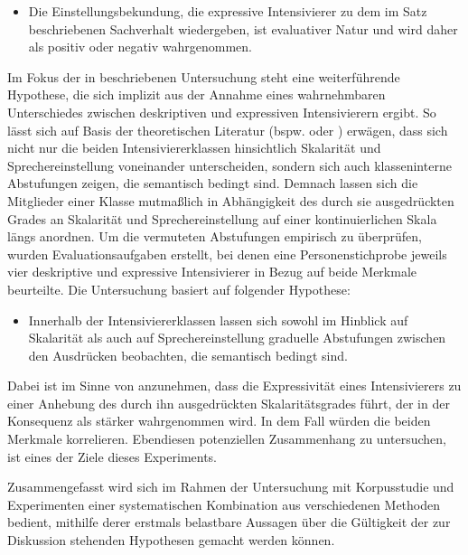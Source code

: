 \begin{itemize} 
\item[\textbf{\textsc{H5}}] Die Einstellungsbekundung, die expressive Intensivierer zu dem im Satz beschriebenen Sachverhalt wiedergeben, ist evaluativer Natur und wird daher als positiv oder negativ wahrgenommen.
\end{itemize}

Im Fokus der in  beschriebenen Untersuchung steht eine weiterführende Hypothese, die sich implizit aus der Annahme eines wahrnehmbaren Unterschiedes zwischen deskriptiven und expressiven Intensivierern ergibt. So lässt sich auf Basis der theoretischen Literatur (bspw. {\citealt[]{Biedermann.1969}} oder \citealt[]{Breindl.2007}) erwägen, dass sich nicht nur die beiden Intensiviererklassen hinsichtlich Skalarität und Sprechereinstellung voneinander unterscheiden, sondern sich auch klasseninterne Abstufungen zeigen, die semantisch bedingt sind. Demnach lassen sich die Mitglieder einer Klasse mutmaßlich in Abhängigkeit des durch sie ausgedrückten Grades an Skalarität und Sprechereinstellung auf einer kontinuierlichen Skala längs anordnen. Um die vermuteten Abstufungen empirisch zu überprüfen, wurden Evaluationsaufgaben erstellt, bei denen eine Personenstichprobe jeweils vier deskriptive und expressive Intensivierer in Bezug auf beide Merkmale beurteilte. Die Untersuchung basiert auf folgender Hypothese:

\begin{itemize}
\item[\textbf{\textsc{H6}}] Innerhalb der Intensiviererklassen lassen sich sowohl im Hinblick auf Skalarität als auch auf Sprechereinstellung graduelle Abstufungen zwischen den Ausdrücken beobachten, die semantisch bedingt sind.
\end{itemize}

\noindent Dabei ist im Sinne von \citet[]{Gutzmann.2019a} anzunehmen, dass die Expressivität eines Intensivierers zu einer Anhebung des durch ihn ausgedrückten Skalaritätsgrades führt, der in der Konsequenz als stärker wahrgenommen wird. In dem Fall würden die beiden Merkmale korrelieren. Ebendiesen potenziellen Zusammenhang zu untersuchen, ist eines der Ziele dieses Experiments.

Zusammengefasst wird sich im Rahmen der Untersuchung mit Korpusstudie und Experimenten einer systematischen Kombination aus verschiedenen Methoden bedient, mithilfe derer erstmals belastbare Aussagen über die Gültigkeit der zur Diskussion stehenden Hypothesen gemacht werden können. 







